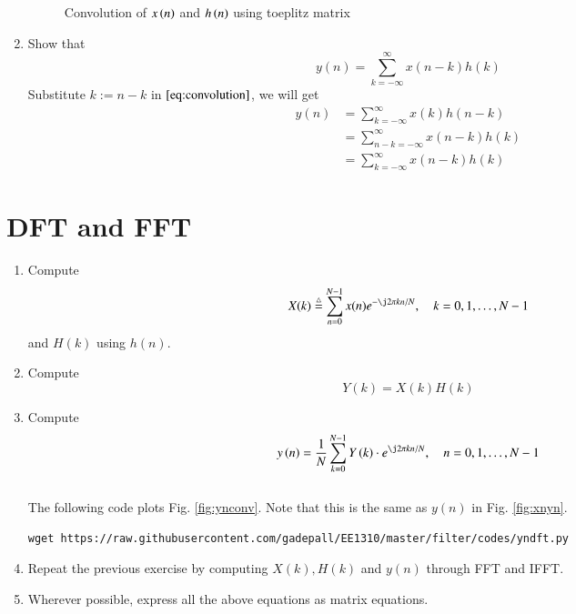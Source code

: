 \documentclass[journal,12pt,twocolumn]{IEEEtran}
\renewcommand\thesection{\arabic{section}}
\begin{document}
\begin{enumerate}[label=\thesection.\arabic*]
\begin{figure}
        \caption{Convolution of $x\left(n\right)$ and $h\left(n\right)$ using toeplitz matrix}
        \label{ynconv_toep}
       \end{figure}
    \item Show that
     \begin{equation}
      y(n) =  \sum_{k=-\infty}^{\infty}x(n-k)h(k)
      \end{equation}
    \solution Substitute $k := n-k$ in $\eqref{eq:convolution}$, we will get 
     \begin{align}
       y(n) &= \sum_{k=-\infty}^{\infty}x(k)h(n-k)\\
            &= \sum_{n - k=-\infty}^{\infty}x(n-k)h(k)\\
            &= \sum_{k = -\infty}^{\infty}x(n-k)h(k)
     \end{align}
       
\end{enumerate}
\section{DFT and FFT}
\begin{enumerate}[label=\thesection.\arabic*]
\item
Compute
\begin{equation}
X(k) \define \sum _{n=0}^{N-1}x(n) e^{-\j2\pi kn/N}, \quad k = 0,1,\dots, N-1
\end{equation}
and $H(k)$ using $h(n)$.
\item Compute 
\begin{equation}
Y(k) = X(k)H(k)
\end{equation}
\item Compute
\begin{equation}
 y\brak{n}={\frac {1}{N}}\sum _{k=0}^{N-1}Y\brak{k}\cdot e^{\j 2\pi kn/N},\quad n = 0,1,\dots, N-1
\end{equation}
\\
\solution The following code plots Fig. \ref{fig:ynconv}. Note that this is the same as 
$y(n)$ in  Fig. 
\ref{fig:xnyn}. 
%
\begin{lstlisting}
wget https://raw.githubusercontent.com/gadepall/EE1310/master/filter/codes/yndft.py
\end{lstlisting}

\item Repeat the previous exercise by computing $X(k), H(k)$ and $y(n)$ through FFT and 
IFFT.
\item Wherever possible, express all the above equations as matrix equations.
\end{enumerate}
%
\end{document}
